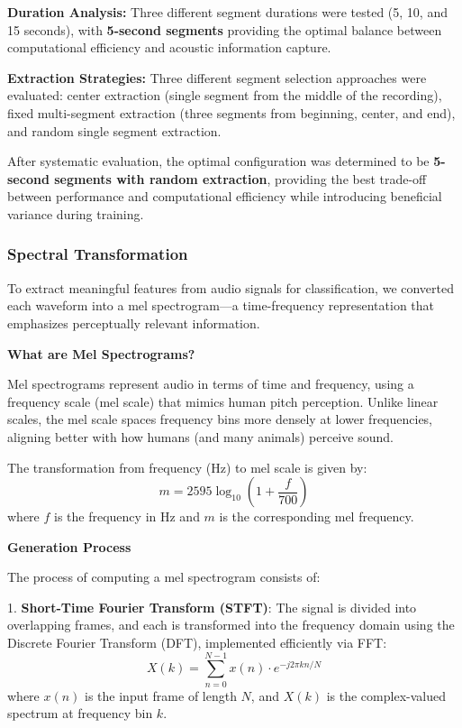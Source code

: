 \documentclass[ERTS, 2025]{ERTS}
\begin{document}
\textbf{Duration Analysis:} Three different segment durations were tested (5, 10, and 15 seconds), with \textbf{5-second segments} providing the optimal balance between computational efficiency and acoustic information capture.

\textbf{Extraction Strategies:} Three different segment selection approaches were evaluated: center extraction (single segment from the middle of the recording), fixed multi-segment extraction (three segments from beginning, center, and end), and random single segment extraction.

After systematic evaluation, the optimal configuration was determined to be \textbf{5-second segments with random extraction}, providing the best trade-off between performance and computational efficiency while introducing beneficial variance during training.

\subsubsection{Spectral Transformation}
To extract meaningful features from audio signals for classification, we converted each waveform into a mel spectrogram—a time-frequency representation that emphasizes perceptually relevant information.

\textbf{What are Mel Spectrograms?}

Mel spectrograms represent audio in terms of time and frequency, using a frequency scale (mel scale) that mimics human pitch perception. Unlike linear scales, the mel scale spaces frequency bins more densely at lower frequencies, aligning better with how humans (and many animals) perceive sound.

The transformation from frequency (Hz) to mel scale is given by:
\begin{equation}
m = 2595 \log_{10}\left(1 + \frac{f}{700}\right)
\end{equation}
where $f$ is the frequency in Hz and $m$ is the corresponding mel frequency.

\textbf{Generation Process}

The process of computing a mel spectrogram consists of:

1. \textbf{Short-Time Fourier Transform (STFT)}: The signal is divided into overlapping frames, and each is transformed into the frequency domain using the Discrete Fourier Transform (DFT), implemented efficiently via FFT:
\begin{equation}
X(k) = \sum_{n=0}^{N-1} x(n) \cdot e^{-j2\pi kn/N}
\end{equation}
where $x(n)$ is the input frame of length $N$, and $X(k)$ is the complex-valued spectrum at frequency bin $k$.
\end{document}
